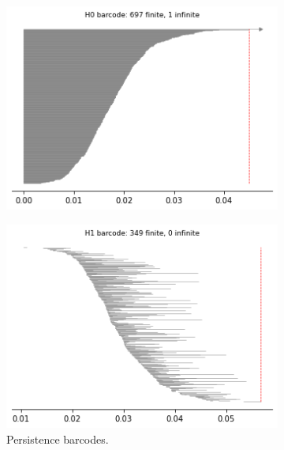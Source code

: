 \begin{figure}[H]
\begin{subfigure}[b]{0.25\textwidth}
\end{subfigure}
\begin{subfigure}[b]{0.24\textwidth}
    \includegraphics[width=\textwidth]{figures/dsphere_H0_barcode.png}
    \caption{}
\end{subfigure}
\begin{subfigure}[b]{0.24\textwidth}
    \includegraphics[width=\textwidth]{figures/dsphere_H1_barcode.png}
        \caption{Persistence barcodes.}
\end{subfigure}
\begin{subfigure}[b]{0.24\textwidth}

\end{subfigure}
\end{figure}

